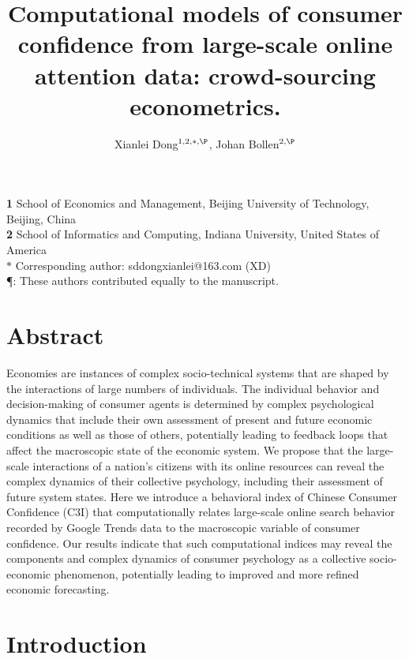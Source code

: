 \documentclass[10pt]{article}
\title{Computational models of consumer confidence from large-scale online attention data: crowd-sourcing econometrics.}
\author{Xianlei Dong$^{1,2,\ast,\P}$,  Johan Bollen$^{2,\P}$}
\begin{document}
\maketitle

\begin{flushleft}
\textbf{1} School of Economics and Management, Beijing University of Technology, Beijing, China\\
\textbf{2} School of Informatics and Computing,   Indiana University, United States of America\\

$\ast$ Corresponding author: sddongxianlei@163.com (XD)\\
\P: These authors contributed equally to the manuscript.
\end{flushleft}	

\section*{Abstract}
Economies are instances of complex socio-technical systems that are shaped by the interactions of large numbers of individuals. The individual behavior and decision-making of consumer agents is determined by complex psychological dynamics that include their own assessment of present and future economic conditions as well as those of others, potentially leading to feedback loops that affect the macroscopic state of the economic system. We propose that the large-scale interactions of a nation's citizens with its online resources can reveal the complex dynamics of their collective psychology, including their assessment of future system states. Here we introduce a behavioral index of Chinese Consumer Confidence (C3I) that computationally relates large-scale online search behavior recorded by Google Trends data to the macroscopic variable of consumer confidence. Our results indicate that such computational indices may reveal the components and complex dynamics of consumer psychology as a collective socio-economic phenomenon, potentially leading to improved and more refined economic forecasting.

\section*{Introduction}
\end{document}
